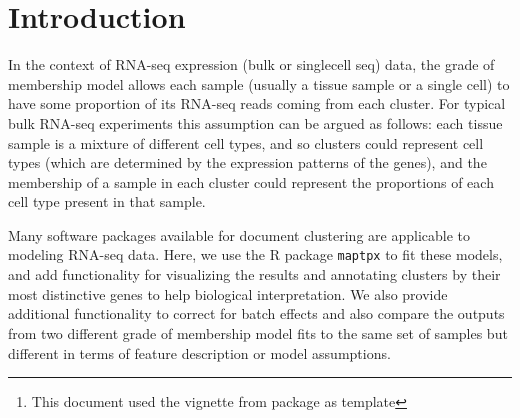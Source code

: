 \documentclass[12pt]{article}\usepackage[]{graphicx}\usepackage[usenames,dvipsnames]{color}
\author{Kushal K Dey, Chiaowen Joyce Hsiao \& Matthew Stephens \\[1em] \small{\textit{Stephens Lab}, The University of Chicago} \mbox{ }\\ \small{\texttt{$^*$Correspondending Email: mstephens@uchicago.edu}}}
\newcommand{\CountClust}{\textit{CountClust}}
\begin{document}
\maketitle

\begin{abstract}
  \vspace{1em}
 Grade of membership or GoM models (also known as admixture models or Latent Dirichlet Allocation") are a generalization of cluster models that allow each sample to have membership in multiple clusters. It is widely used to model ancestry of individuals in population genetics based on SNP/ microsatellite data and also in natural language processing for modeling documents \cite{Pritchard2000, Blei2003}.

This \R{} package implements tools to visualize the clusters obtained from fitting topic models using a Structure plot \cite{Rosenberg2002} and extract the top features/genes that distinguish the clusters. In presence of known technical or batch effects, the package also allows for correction of these confounding effects.

\vspace{1em}
\textbf{\CountClust{} version:} 0.99.4 \footnote{This document used the vignette from \Bioconductor{} package  as  template}
\end{abstract}




\newpage

\tableofcontents

\section{Introduction}

In the context of RNA-seq expression (bulk or singlecell seq) data, the grade of membership model allows each sample (usually a tissue sample or a single cell) to have some proportion of its RNA-seq reads coming from each cluster. For typical bulk RNA-seq experiments this assumption
can be argued as follows: each tissue sample is a mixture of different cell types, and so clusters could represent cell types (which are determined by the expression patterns of the genes), and the membership of a sample in each cluster could represent the proportions of each cell type present in that sample.

Many software packages available for document clustering are applicable to modeling RNA-seq data. Here, we use the R package {\tt maptpx} \cite{Taddy2012} to fit these models, and add functionality for visualizing the results and annotating clusters by their most distinctive genes to help biological interpretation. We also provide additional functionality to correct for batch effects and also compare the outputs from two different grade of membership model fits to the same set of samples but different in terms of feature description or model assumptions.
\end{document}
